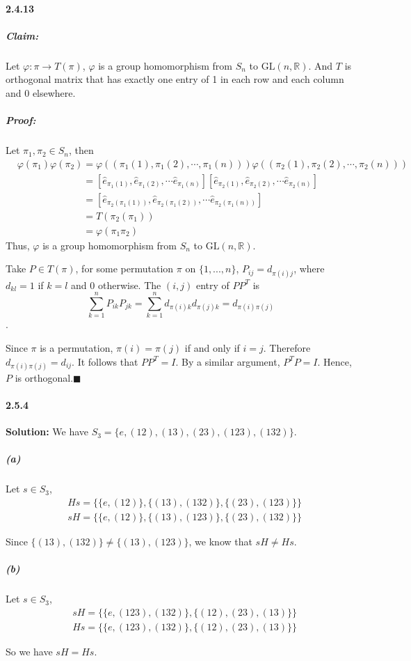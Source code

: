 \documentclass[11pt]{article}
\begin{document}
	\paragraph{2.4.13}
		\subparagraph{Claim:}
			Let $\varphi: \pi \rightarrow T(\pi)$, $\varphi$ is a group homomorphism from $S_n$ to $\mathrm{GL}(n, \mathbb{R})$. And $T$ is orthogonal matrix that has exactly one entry of 1 in each row and each column and 0 elsewhere.
		\subparagraph{Proof:}
			Let $\pi_1, \pi_2 \in S_n$, then
				\begin{align}
					&\varphi(\pi_1)\varphi(\pi_2) = \varphi((\pi_1(1), \pi_1(2), \cdots, \pi_1(n)))\varphi((\pi_2(1), \pi_2(2), \cdots, \pi_2(n)))\nonumber\\
					&\phantom{\varphi(\pi_1)\varphi(\pi_2)} = [\hat{e}_{\pi_1(1)}, \hat{e}_{\pi_1(2)}, \cdots \hat{e}_{\pi_1(n)}][\hat{e}_{\pi_2(1)}, \hat{e}_{\pi_2(2)}, \cdots \hat{e}_{\pi_2(n)}]\nonumber\\
					&\phantom{\varphi(\pi_1)\varphi(\pi_2)} = [\hat{e}_{\pi_2(\pi_1(1))}, \hat{e}_{\pi_2(\pi_1(2))}, \cdots \hat{e}_{\pi_2(\pi_1(n))}]\nonumber\\
					&\phantom{\varphi(\pi_1)\varphi(\pi_2)} = T(\pi_2(\pi_1))\nonumber\\
					&\phantom{\varphi(\pi_1)\varphi(\pi_2)} = \varphi(\pi_1\pi_2)\nonumber
				\end{align}
				Thus, $\varphi$ is a group homomorphism from $S_n$ to $\mathrm{GL}(n, \mathbb{R})$.
				
				Take $P \in T(\pi)$, for some permutation $\pi$ on $\{1,...,n\}$, $P_{ij} = d_{\pi(i)j}$, where $d_{kl} = 1$ if $k = l$ and $0$ otherwise. The $(i,j)$ entry of $PP^T$ is 
						\[\sum_{k = 1}^n P_{ik} P_{jk} = \sum_{k = 1}^n d_{\pi(i)k} d_{\pi(j)k} = d_{\pi(i)\pi(j)}\]. 

					Since $\pi$ is a permutation, $\pi(i) = \pi(j)$ if and only if $i = j$. Therefore $d_{\pi(i)\pi(j)} = d_{ij}$. It follows that $PP^T = I$. By a similar argument, $P^TP = I$. Hence, $P$ is orthogonal.$\blacksquare$ 
	\paragraph{2.5.4}\textbf{Solution:}
		We have $S_3 = \{e, (12), (13), (23), (123), (132)\}$.
		\subparagraph{(a)}
			Let $s \in S_3$, 
			\begin{align}
				&Hs = \{\{e, (12)\}, \{(13), (132)\}, \{(23), (123)\}\}\nonumber\\
				&sH = \{\{e, (12)\}, \{(13), (123)\}, \{(23), (132)\}\}\nonumber
			\end{align}
			
			Since $\{(13), (132)\} \neq \{(13), (123)\}$, we know that $sH \neq Hs$.
		\subparagraph{(b)}
			Let $s \in S_3$, 
			\begin{align}
				&sH = \{\{e,(123),(132)\},\{(12),(23),(13)\}\}\nonumber\\
				&Hs = \{\{e,(123),(132)\},\{(12),(23),(13)\}\}\nonumber
			\end{align}
			
			So we have $sH = Hs$.
\end{document}
